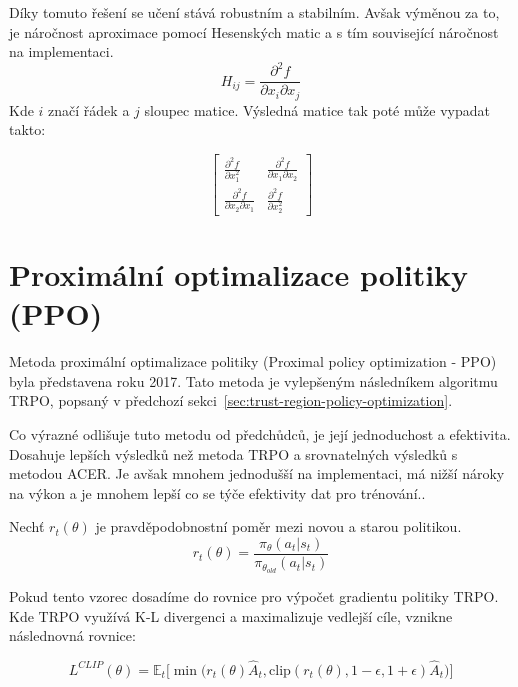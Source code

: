 Díky tomuto řešení se učení stává robustním a stabilním.
Avšak výměnou za to, je náročnost aproximace pomocí Hesenských matic a s tím související náročnost na implementaci.
\begin{equation}
  H_{ij} = \frac{\partial^2 f}{\partial x_i \partial x_j}
\end{equation}
Kde $i$ značí řádek a $j$ sloupec matice.
Výsledná matice tak poté může vypadat takto:

\begin{equation}
  \begin{bmatrix}
     \frac{\partial^2 f}{\partial x_1^2} & \frac{\partial^2 f}{\partial x_1 \partial x_2} \\
     \frac{\partial^2 f}{\partial x_2 \partial x_1} & \frac{\partial^2 f}{\partial x_2^2}
   \end{bmatrix}
\end{equation}

\section{Proximální optimalizace politiky (PPO)}
\label{sec:proximalni-optimalizace-politiky}


Metoda proximální optimalizace politiky (Proximal policy optimization - PPO) byla představena roku 2017\cite{PPO_paper}.
Tato metoda je vylepšeným následníkem algoritmu TRPO, popsaný v předchozí sekci~\ref{sec:trust-region-policy-optimization}.

Co výrazné odlišuje tuto metodu od předchůdců, je její jednoduchost a efektivita.
Dosahuje lepších výsledků než metoda TRPO a srovnatelných výsledků s metodou ACER.
Je avšak mnohem jednodušší na implementaci, má nižší nároky na výkon a je mnohem lepší co se týče efektivity dat pro trénování.\cite{PPO_paper}.

Nechť $r_t(\theta)$ je pravděpodobnostní poměr mezi novou a starou politikou.
\begin{equation}
  r_t(\theta) = \frac{\pi_\theta(a_t \vert s_t)}{\pi_{\theta_{old}}(a_t \vert s_t)}
\end{equation}

Pokud tento vzorec dosadíme do rovnice pro výpočet gradientu politiky TRPO. Kde TRPO využívá K-L divergenci a maximalizuje vedlejší cíle, vznikne následnovná rovnice:

\begin{equation}
  L^{CLIP}(\theta) = \mathbb{E}_t \Big[ \min \Big( r_t(\theta) \hat{A}_t, \text{clip}(r_t(\theta), 1-\epsilon, 1+\epsilon) \hat{A}_t \Big) \Big]
\end{equation}


